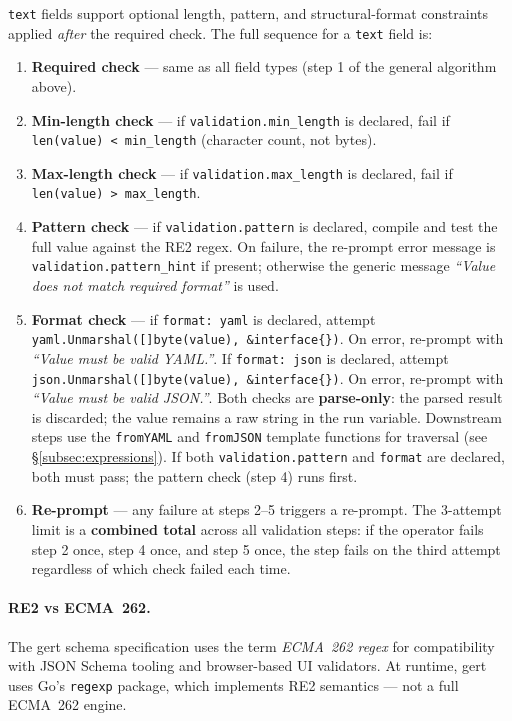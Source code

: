 \texttt{text} fields support optional length, pattern, and structural-format
constraints applied \emph{after} the required check.  The full sequence for a
\texttt{text} field is:

\begin{enumerate}
  \item \textbf{Required check} — same as all field types (step 1 of the general
        algorithm above).
  \item \textbf{Min-length check} — if \texttt{validation.min\_length} is declared,
        fail if \texttt{len(value) < min\_length} (character count, not bytes).
  \item \textbf{Max-length check} — if \texttt{validation.max\_length} is declared,
        fail if \texttt{len(value) > max\_length}.
  \item \textbf{Pattern check} — if \texttt{validation.pattern} is declared, compile
        and test the full value against the RE2 regex.  On failure, the re-prompt
        error message is \texttt{validation.pattern\_hint} if present; otherwise the
        generic message \emph{``Value does not match required format''} is used.
  \item \textbf{Format check} — if \texttt{format: yaml} is declared, attempt
        \texttt{yaml.Unmarshal([]byte(value), \&interface\{\})}.  On error, re-prompt
        with \emph{``Value must be valid YAML.''}.  If \texttt{format: json} is
        declared, attempt \texttt{json.Unmarshal([]byte(value), \&interface\{\})}.
        On error, re-prompt with \emph{``Value must be valid JSON.''}.  Both checks
        are \textbf{parse-only}: the parsed result is discarded; the value remains a
        raw string in the run variable.  Downstream steps use the \texttt{fromYAML}
        and \texttt{fromJSON} template functions for traversal
        (see §\ref{subsec:expressions}).  If both \texttt{validation.pattern}
        and \texttt{format} are declared, both must pass; the pattern check (step 4)
        runs first.
  \item \textbf{Re-prompt} — any failure at steps 2--5 triggers a re-prompt.  The
        3-attempt limit is a \textbf{combined total} across all validation steps: if
        the operator fails step 2 once, step 4 once, and step 5 once, the step fails
        on the third attempt regardless of which check failed each time.
\end{enumerate}

\paragraph{RE2 vs ECMA~262.}
The gert schema specification uses the term \emph{ECMA~262 regex} for compatibility
with JSON Schema tooling and browser-based UI validators.  At runtime, gert uses Go's
\texttt{regexp} package, which implements RE2 semantics — not a full ECMA~262 engine.

